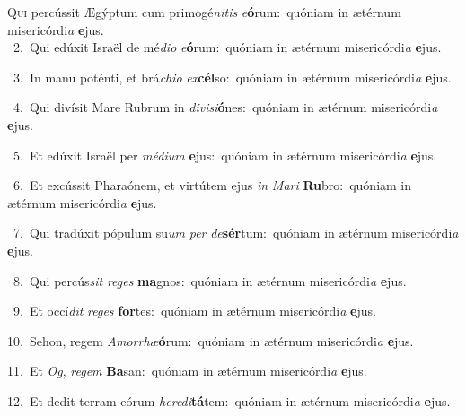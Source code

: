 \lettrine{\initial\textcolor{\initialcolor}{Q}}{ui} percússit Ægýptum cum primogé\-\textit{ni}\-\textit{tis} \textit{e}\-\textbf{ó}rum:~\star quóniam in ætérnum misericórdi\textit{a} \textbf{e}\-jus.\\
{\numbfont\textcolor{\numbcolor}{~2.}}~Qui edúxit Israël de mé\-\textit{di}\-\textit{o} \textit{e}\-\textbf{ó}rum:~\star quóniam in ætérnum misericórdi\textit{a} \textbf{e}\-jus.\par
{\numbfont\textcolor{\numbcolor}{~3.}}~In manu poténti, et brá\-\textit{chi}\-\textit{o} \textit{ex}\-\textbf{cél}so:~\star quóniam in ætérnum misericórdi\textit{a} \textbf{e}\-jus.\par
{\numbfont\textcolor{\numbcolor}{~4.}}~Qui divísit Mare Rubrum in \textit{di}\-\textit{vi}\textit{si}\textbf{ó}nes:~\star quóniam in ætérnum misericórdi\textit{a} \textbf{e}\-jus.\par
{\numbfont\textcolor{\numbcolor}{~5.}}~Et edúxit Israël per \textit{mé}\-\textit{di}\textit{um} \textbf{e}\-jus:~\star quóniam in ætérnum misericórdi\textit{a} \textbf{e}\-jus.\par
{\numbfont\textcolor{\numbcolor}{~6.}}~Et excússit Pharaónem, et virtútem ejus \textit{in} \textit{Ma}\-\textit{ri} \textbf{Ru}\-bro:~\star quóniam in ætérnum misericórdi\textit{a} \textbf{e}\-jus.\par
{\numbfont\textcolor{\numbcolor}{~7.}}~Qui tradúxit pópulum su\textit{um} \textit{per} \textit{de}\-\textbf{sér}tum:~\star quóniam in ætérnum misericórdi\textit{a} \textbf{e}\-jus.\par
{\numbfont\textcolor{\numbcolor}{~8.}}~Qui percús\textit{sit} \textit{re}\-\textit{ges} \textbf{ma}\-gnos:~\star quóniam in ætérnum misericórdi\textit{a} \textbf{e}\-jus.\par
{\numbfont\textcolor{\numbcolor}{~9.}}~Et occí\textit{dit} \textit{re}\-\textit{ges} \textbf{for}\-tes:~\star quóniam in ætérnum misericórdi\textit{a} \textbf{e}\-jus.\par
{\numbfont\textcolor{\numbcolor}{10.}}~Sehon, regem \textit{A}\-\textit{mor}\textit{rhæ}\textbf{ó}rum:~\star quóniam in ætérnum misericórdi\textit{a} \textbf{e}\-jus.\par
{\numbfont\textcolor{\numbcolor}{11.}}~Et \textit{Og}\-, \textit{re}\-\textit{gem} \textbf{Ba}\-san:~\star quóniam in ætérnum misericórdi\textit{a} \textbf{e}\-jus.\par
{\numbfont\textcolor{\numbcolor}{12.}}~Et dedit terram eórum \textit{he}\-\textit{re}\textit{di}\textbf{tá}tem:~\star quóniam in ætérnum misericórdi\textit{a} \textbf{e}\-jus.\par
